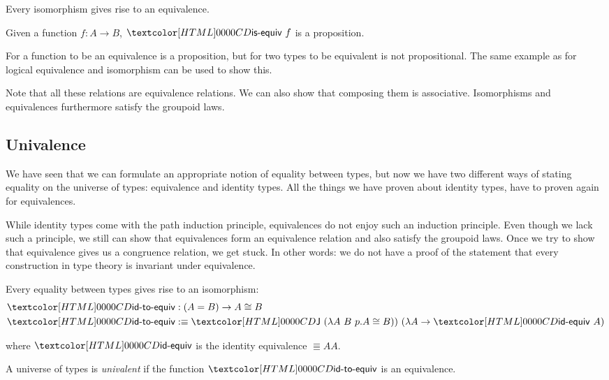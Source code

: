 \begin{proposition}
  Every isomorphism gives rise to an equivalence.
\end{proposition}

\begin{proposition}
  Given a function $f : A \to B$, $\isequiv\ f$ is a proposition.
\end{proposition}

For a function to be an equivalence is a proposition, but for two
types to be equivalent is not propositional. The same example as for
logical equivalence and isomorphism can be used to show this.

Note that all these relations are equivalence relations. We can also
show that composing them is associative. Isomorphisms and
equivalences furthermore satisfy the groupoid laws.

\subsection{Univalence}

We have seen that we can formulate an appropriate notion of equality
between types, but now we have two different ways of stating equality
on the universe of types: equivalence and identity types. All the
things we have proven about identity types, have to proven again for
equivalences.

While identity types come with the path induction principle,
equivalences do not enjoy such an induction principle. Even though we
lack such a principle, we still can show that equivalences form an
equivalence relation and also satisfy the groupoid laws. Once we try
to show that equivalence gives us a congruence relation, we get
stuck. In other words: we do not have a proof of the statement that
every construction in type theory is invariant under equivalence.

\begin{definition}
  Every equality between types gives rise to an isomorphism:
  \begin{align*}
    &\idtoequiv : (A = B) \to \Equiv{A}{B} \\
    &\idtoequiv \ddefeq \J\ (\lambda A\ B\ p . \Equiv{A}{B}))\ (\lambda A \to \idequiv\ A)
  \end{align*}

  where $\idequiv$ is the identity equivalence $\Equiv{A}{A}$.
\end{definition}

\begin{definition}[Univalence]
  A universe of types is \emph{univalent} if the function $\idtoequiv$
  is an equivalence.
\end{definition}

